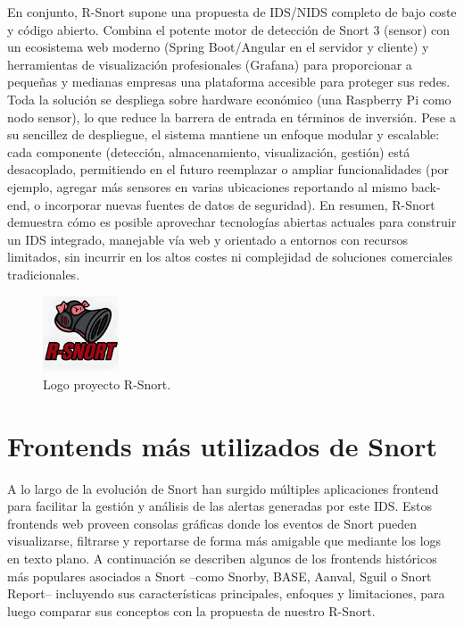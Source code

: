 \documentclass[11pt,a4paper,twoside]{report}
\begin{document}
En conjunto, R-Snort supone una propuesta de IDS/NIDS completo de bajo coste y código abierto. Combina el potente motor de detección de Snort 3 (sensor) con un ecosistema web moderno (Spring Boot/Angular en el servidor y cliente) y herramientas de visualización profesionales (Grafana) para proporcionar a pequeñas y medianas empresas una plataforma accesible para proteger sus redes. Toda la solución se despliega sobre hardware económico (una Raspberry Pi como nodo sensor), lo que reduce la barrera de entrada en términos de inversión. Pese a su sencillez de despliegue, el sistema mantiene un enfoque modular y escalable: cada componente (detección, almacenamiento, visualización, gestión) está desacoplado, permitiendo en el futuro reemplazar o ampliar funcionalidades (por ejemplo, agregar más sensores en varias ubicaciones reportando al mismo back-end, o incorporar nuevas fuentes de datos de seguridad). En resumen, R-Snort demuestra cómo es posible aprovechar tecnologías abiertas actuales para construir un IDS integrado, manejable vía web y orientado a entornos con recursos limitados, sin incurrir en los altos costes ni complejidad de soluciones comerciales tradicionales.

\begin{figure}[hbtp]
	\centering
	\includegraphics[width=0.2\textwidth]{logo.png}
	\caption{Logo proyecto R-Snort.}
	\label{fig:logo-rsnort}
\end{figure}

\section{Frontends más utilizados de Snort}

A lo largo de la evolución de Snort han surgido múltiples aplicaciones frontend para facilitar la gestión y análisis de las alertas generadas por este IDS. Estos frontends web proveen consolas gráficas donde los eventos de Snort pueden visualizarse, filtrarse y reportarse de forma más amigable que mediante los logs en texto plano. A continuación se describen algunos de los frontends históricos más populares asociados a Snort –como Snorby, BASE, Aanval, Sguil o Snort Report– incluyendo sus características principales, enfoques y limitaciones, para luego comparar sus conceptos con la propuesta de nuestro R-Snort.\newline
\end{document}
